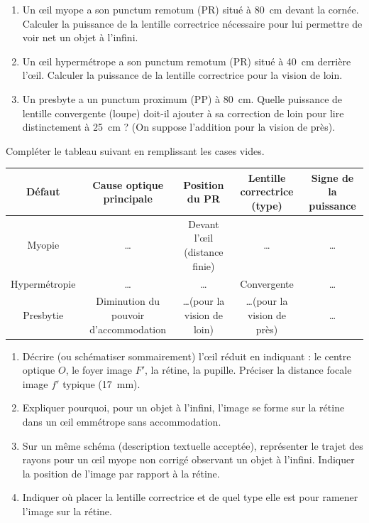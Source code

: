 \documentclass[11pt]{article}
\begin{document}
\begin{exercice}
\begin{enumerate}
    \item Un œil myope a son punctum remotum (PR) situé à \SI{80}{\centi\metre} devant la cornée. Calculer la puissance de la lentille correctrice nécessaire pour lui permettre de voir net un objet à l'infini.
    \item Un œil hypermétrope a son punctum remotum (PR) situé à \SI{40}{\centi\metre} derrière l'œil. Calculer la puissance de la lentille correctrice pour la vision de loin.
    \item Un presbyte a un punctum proximum (PP) à \SI{80}{\centi\metre}. Quelle puissance de lentille convergente (loupe) doit-il ajouter à sa correction de loin pour lire distinctement à \SI{25}{\centi\metre} ? (On suppose l'addition pour la vision de près).
\end{enumerate}
\end{exercice}

\begin{exercice}
Compléter le tableau suivant en remplissant les cases vides.

\begin{tabular}{|c|c|c|c|c|}
\hline
\textbf{Défaut} & \textbf{Cause optique principale} & \textbf{Position du PR} & \textbf{Lentille correctrice (type)} & \textbf{Signe de la puissance} \\
\hline
Myopie & \ldots & Devant l'œil (distance finie) & \ldots & \ldots \\
\hline
Hypermétropie & \ldots & \ldots & Convergente & \ldots \\
\hline
Presbytie & Diminution du pouvoir d'accommodation & \ldots (pour la vision de loin) & \ldots (pour la vision de près) & \ldots \\
\hline
\end{tabular}
\end{exercice}

\begin{exercice}
\begin{enumerate}
    \item Décrire (ou schématiser sommairement) l'œil réduit en indiquant : le centre optique $O$, le foyer image $F'$, la rétine, la pupille. Préciser la distance focale image $f'$ typique (\SI{17}{\milli\metre}).
    \item Expliquer pourquoi, pour un objet à l'infini, l'image se forme sur la rétine dans un œil emmétrope sans accommodation.
    \item Sur un même schéma (description textuelle acceptée), représenter le trajet des rayons pour un œil myope non corrigé observant un objet à l'infini. Indiquer la position de l'image par rapport à la rétine.
    \item Indiquer où placer la lentille correctrice et de quel type elle est pour ramener l'image sur la rétine.
\end{enumerate}
\end{exercice}
\end{document}
